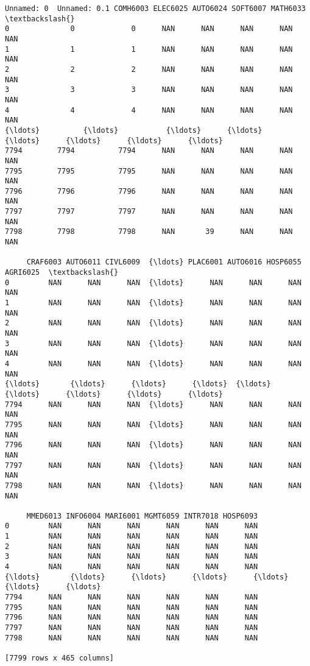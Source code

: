 \documentclass[11pt]{article}
\makeatletter
\newcommand{\boxspacing}{\kern\kvtcb@left@rule\kern\kvtcb@boxsep}
\newcommand{\prompt}[4]{
        \ttfamily\llap{{\color{#2}[#3]:\hspace{3pt}#4}}\vspace{-\baselineskip}
    }
\makeatother
\begin{document}
            \begin{tcolorbox}[breakable, size=fbox, boxrule=.5pt, pad at break*=1mm, opacityfill=0]
\prompt{Out}{outcolor}{13}{\boxspacing}
\begin{Verbatim}[commandchars=\\\{\}]
      Unnamed: 0  Unnamed: 0.1 COMH6003 ELEC6025 AUTO6024 SOFT6007 MATH6033  \textbackslash{}
0              0             0      NAN      NAN      NAN      NAN      NAN
1              1             1      NAN      NAN      NAN      NAN      NAN
2              2             2      NAN      NAN      NAN      NAN      NAN
3              3             3      NAN      NAN      NAN      NAN      NAN
4              4             4      NAN      NAN      NAN      NAN      NAN
{\ldots}          {\ldots}           {\ldots}      {\ldots}      {\ldots}      {\ldots}      {\ldots}      {\ldots}
7794        7794          7794      NAN      NAN      NAN      NAN      NAN
7795        7795          7795      NAN      NAN      NAN      NAN      NAN
7796        7796          7796      NAN      NAN      NAN      NAN      NAN
7797        7797          7797      NAN      NAN      NAN      NAN      NAN
7798        7798          7798      NAN       39      NAN      NAN      NAN

     CRAF6003 AUTO6011 CIVL6009  {\ldots} PLAC6001 AUTO6016 HOSP6055 AGRI6025  \textbackslash{}
0         NAN      NAN      NAN  {\ldots}      NAN      NAN      NAN      NAN
1         NAN      NAN      NAN  {\ldots}      NAN      NAN      NAN      NAN
2         NAN      NAN      NAN  {\ldots}      NAN      NAN      NAN      NAN
3         NAN      NAN      NAN  {\ldots}      NAN      NAN      NAN      NAN
4         NAN      NAN      NAN  {\ldots}      NAN      NAN      NAN      NAN
{\ldots}       {\ldots}      {\ldots}      {\ldots}  {\ldots}      {\ldots}      {\ldots}      {\ldots}      {\ldots}
7794      NAN      NAN      NAN  {\ldots}      NAN      NAN      NAN      NAN
7795      NAN      NAN      NAN  {\ldots}      NAN      NAN      NAN      NAN
7796      NAN      NAN      NAN  {\ldots}      NAN      NAN      NAN      NAN
7797      NAN      NAN      NAN  {\ldots}      NAN      NAN      NAN      NAN
7798      NAN      NAN      NAN  {\ldots}      NAN      NAN      NAN      NAN

     MMED6013 INFO6004 MARI6001 MGMT6059 INTR7018 HOSP6093
0         NAN      NAN      NAN      NAN      NAN      NAN
1         NAN      NAN      NAN      NAN      NAN      NAN
2         NAN      NAN      NAN      NAN      NAN      NAN
3         NAN      NAN      NAN      NAN      NAN      NAN
4         NAN      NAN      NAN      NAN      NAN      NAN
{\ldots}       {\ldots}      {\ldots}      {\ldots}      {\ldots}      {\ldots}      {\ldots}
7794      NAN      NAN      NAN      NAN      NAN      NAN
7795      NAN      NAN      NAN      NAN      NAN      NAN
7796      NAN      NAN      NAN      NAN      NAN      NAN
7797      NAN      NAN      NAN      NAN      NAN      NAN
7798      NAN      NAN      NAN      NAN      NAN      NAN

[7799 rows x 465 columns]
\end{Verbatim}
\end{tcolorbox}
        
\end{document}
